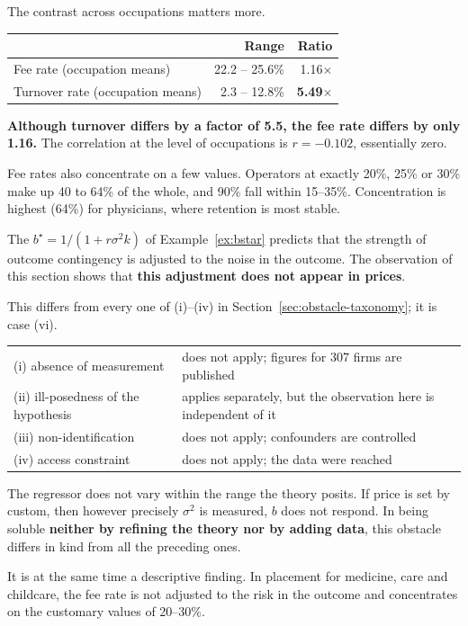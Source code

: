 The contrast across occupations matters more.

\begin{center}
\begin{tabular}{@{}lrr@{}}
\toprule
 & Range & Ratio \\
\midrule
Fee rate (occupation means) & 22.2 -- 25.6\% & 1.16$\times$ \\
Turnover rate (occupation means) & 2.3 -- 12.8\% & \textbf{5.49$\times$} \\
\bottomrule
\end{tabular}
\label{tab:fee-turnover-asymmetry}
\end{center}

\textbf{Although turnover differs by a factor of 5.5, the fee rate differs by only 1.16.} The
correlation at the level of occupations is $r=-0.102$, essentially zero.

Fee rates also concentrate on a few values. Operators at exactly 20\%, 25\% or 30\% make up 40 to
64\% of the whole, and 90\% fall within 15--35\%. Concentration is highest (64\%) for physicians,
where retention is most stable.

\begin{remark}
\label{rem:no-adjustment}
The $b^\star=1/(1+r\sigma^2 k)$ of Example~\ref{ex:bstar} predicts that the strength of outcome
contingency is adjusted to the noise in the outcome. The observation of this section shows that
\textbf{this adjustment does not appear in prices}.

This differs from every one of (i)--(iv) in Section~\ref{sec:obstacle-taxonomy}; it is case (vi).

\begin{center}
\begin{tabularx}{\textwidth}{@{}lX@{}}
\toprule
(i) absence of measurement & does not apply; figures for 307 firms are published \\
(ii) ill-posedness of the hypothesis & applies separately, but the observation here is independent of it \\
(iii) non-identification & does not apply; confounders are controlled \\
(iv) access constraint & does not apply; the data were reached \\
\bottomrule
\end{tabularx}
\label{tab:predX-taxonomy-check}
\end{center}

The regressor does not vary within the range the theory posits. If price is set by custom, then
however precisely $\sigma^2$ is measured, $b$ does not respond. In being soluble
\textbf{neither by refining the theory nor by adding data}, this obstacle differs in kind from
all the preceding ones.

It is at the same time a descriptive finding. In placement for medicine, care and childcare, the
fee rate is not adjusted to the risk in the outcome and concentrates on the customary values of
20--30\%.
\end{remark}


